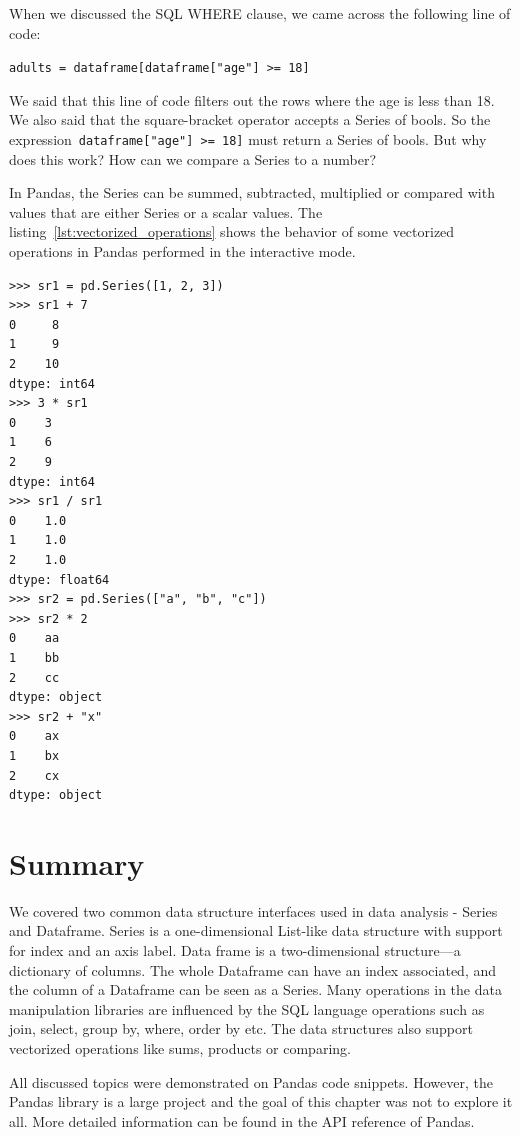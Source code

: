 When we discussed the SQL WHERE clause, we came across the following line of code:

\verb|adults = dataframe[dataframe["age"] >= 18]|

We said that this line of code filters out the rows where the age is less than 18.
We also said that the square-bracket operator accepts a Series of bools.
So the expression~\verb|dataframe["age"] >= 18]| must return a Series of bools.
But why does this work?
How can we compare a Series to a number?

In Pandas, the Series can be summed, subtracted, multiplied or compared with values that are either Series or a scalar
values.
The listing~\ref{lst:vectorized_operations} shows the behavior of some vectorized operations in Pandas performed in
the interactive mode.

\begin{lstlisting}[caption=Vectorized operations, label={lst:vectorized_operations}, captionpos=b]
>>> sr1 = pd.Series([1, 2, 3])
>>> sr1 + 7
0     8
1     9
2    10
dtype: int64
>>> 3 * sr1
0    3
1    6
2    9
dtype: int64
>>> sr1 / sr1
0    1.0
1    1.0
2    1.0
dtype: float64
>>> sr2 = pd.Series(["a", "b", "c"])
>>> sr2 * 2
0    aa
1    bb
2    cc
dtype: object
>>> sr2 + "x"
0    ax
1    bx
2    cx
dtype: object
\end{lstlisting}

\section*{Summary} %

We covered two common data structure interfaces used in data analysis - Series and Dataframe.
Series is a one-dimensional List-like data structure with support for index and an axis label.
Data frame is a two-dimensional structure---a dictionary of columns.
The whole Dataframe can have an index associated, and the column of a Dataframe can be seen as a Series.
Many operations in the data manipulation libraries are influenced by the SQL language operations such as join, select,
group by, where, order by etc.
The data structures also support vectorized operations like sums, products or comparing.

All discussed topics were demonstrated on Pandas code snippets.
However, the Pandas library is a large project and the goal of this chapter was not to explore it all.
More detailed information can be found in the API reference of Pandas\cite{pandas_docs}.
